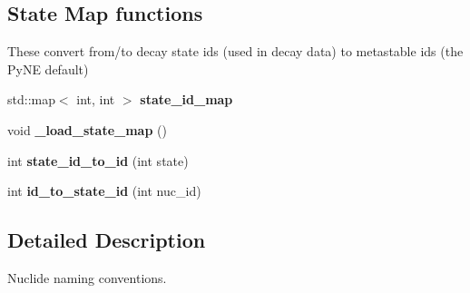 \subsection*{State Map functions}
\label{_amgrp70bdf518b2e9e67e047a392686df556d}%
These convert from/to decay state ids (used in decay data) to metastable ids (the Py\+N\+E default) \begin{DoxyCompactItemize}
\item 
\hypertarget{namespacepyne_1_1nucname_a1bfcc87b4ac9c3f6634ea5a495871d7b}{std\+::map$<$ int, int $>$ {\bfseries state\+\_\+id\+\_\+map}}\label{namespacepyne_1_1nucname_a1bfcc87b4ac9c3f6634ea5a495871d7b}

\item 
\hypertarget{namespacepyne_1_1nucname_aa0f5efb8d3be5214acf8440dae8d4280}{void {\bfseries \+\_\+load\+\_\+state\+\_\+map} ()}\label{namespacepyne_1_1nucname_aa0f5efb8d3be5214acf8440dae8d4280}

\item 
\hypertarget{namespacepyne_1_1nucname_a91e9f43c7bfd01149545704c0a0d003a}{int {\bfseries state\+\_\+id\+\_\+to\+\_\+id} (int state)}\label{namespacepyne_1_1nucname_a91e9f43c7bfd01149545704c0a0d003a}

\item 
\hypertarget{namespacepyne_1_1nucname_aacc2935da529ea5f25324c17a3fba2d4}{int {\bfseries id\+\_\+to\+\_\+state\+\_\+id} (int nuc\+\_\+id)}\label{namespacepyne_1_1nucname_aacc2935da529ea5f25324c17a3fba2d4}

\end{DoxyCompactItemize}


\subsection{Detailed Description}
Nuclide naming conventions. 

